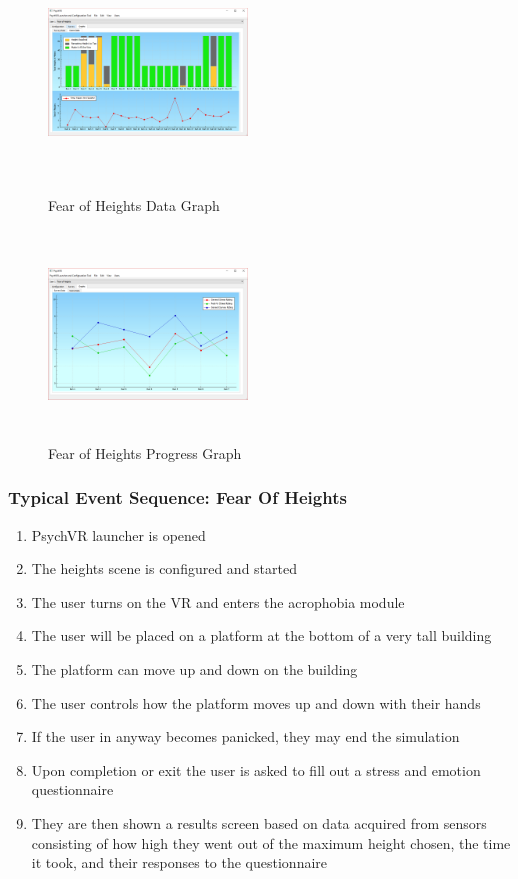 \documentclass[a4paper,10pt]{article}
\begin{document}
\begin{figure}[H]
	\centering
	\begin{minipage}{0.45\textwidth}
		\centering
		\includegraphics[width=200px, height=210px, keepaspectratio]{qtHeightGraph.png}
		\caption{Fear of Heights Data Graph}
		\label{fig:heightQtGraph}
	\end{minipage}\hfill
	\begin{minipage}{0.45\textwidth}
		\centering
		\includegraphics[width=200px, height=210px, keepaspectratio]{qtHeightProgress.png}
		\caption{Fear of Heights Progress Graph}
		\label{fig:heightQtSurveyResults}
	\end{minipage}
\end{figure}

\pagebreak
\subsubsection{Typical Event Sequence: Fear Of Heights}
\begin{enumerate}
	\item PsychVR launcher is opened
	\item The heights scene is configured and started
	\item The user turns on the VR and enters the acrophobia module
	\item The user will be placed on a platform at the bottom of a very tall building
	\item The platform can move up and down on the building
	\item The user controls how the platform moves up and down with their hands
	\item If the user in anyway becomes panicked, they may end the simulation
	\item Upon completion or exit the user is asked to fill out a stress and emotion questionnaire
	\item They are then shown a results screen based on data acquired from sensors consisting of how high they went out of the maximum height chosen, the time it took, and their responses to the questionnaire
\end{enumerate}
\pagebreak
\end{document}
